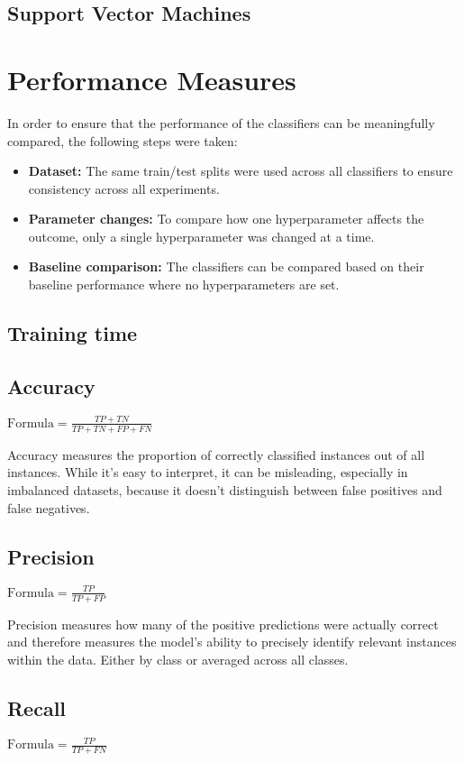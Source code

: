 \documentclass{article}
\begin{document}
\subsection{Support Vector Machines}

\section{Performance Measures}
In order to ensure that the performance of the classifiers can be meaningfully compared, the following steps were taken:
\begin{itemize}
    \item \textbf{Dataset:} The same train/test splits were used across all classifiers to ensure consistency across all experiments.
    \item \textbf{Parameter changes:} To compare how one hyperparameter affects the outcome, only a single hyperparameter was changed at a time.
    \item \textbf{Baseline comparison:} The classifiers can be compared based on their baseline performance where no hyperparameters are set.
\end{itemize}

\subsection{Training time}
\subsection{Accuracy}
$\text{Formula} = \frac{TP + TN}{TP + TN + FP + FN}$

Accuracy measures the proportion of correctly classified instances out of all instances. While it’s easy to interpret, it can be misleading, especially in imbalanced datasets, because it doesn't distinguish between false positives and false negatives.

\subsection{Precision}
$\text{Formula} = \frac{TP}{TP + FP}$

Precision measures how many of the positive predictions were actually correct and therefore measures the model’s ability to precisely identify relevant instances within the data. Either by class or averaged across all classes.

\subsection{Recall}
$\text{Formula} = \frac{TP}{TP + FN}$
\end{document}
